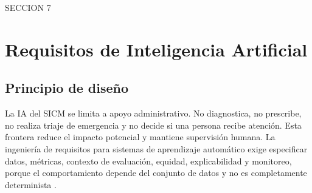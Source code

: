 \documentclass[11pt,a4paper]{article}
\begin{document}
\clearpage

  SECCION 7
\section{Requisitos de Inteligencia Artificial}
\subsection{Principio de diseño}
La IA del SICM se limita a apoyo administrativo. No diagnostica, no prescribe, no realiza triaje de emergencia y no decide si una persona recibe atención. Esta frontera reduce el impacto potencial y mantiene supervisión humana. La ingeniería de requisitos para sistemas de aprendizaje automático exige especificar datos, métricas, contexto de evaluación, equidad, explicabilidad y monitoreo, porque el comportamiento depende del conjunto de datos y no es completamente determinista \cite{vogelsang2019,ahmad2023,habibullah2023}. 
\end{document}

